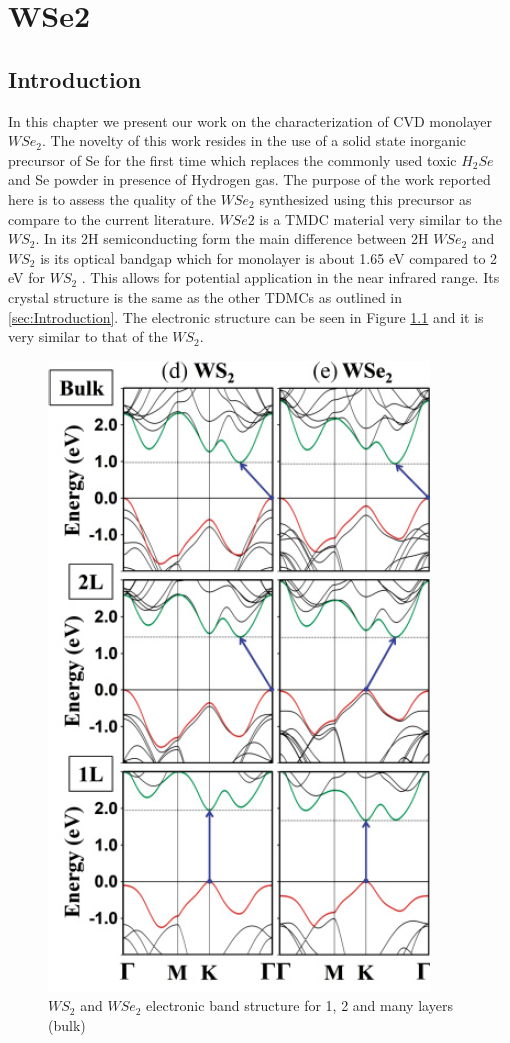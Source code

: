 \chapter{WSe2}

\section{Introduction}
	
	In this chapter we present our work on the characterization of CVD monolayer $WSe_2$. The novelty of this work resides in the use of a solid state inorganic precursor of Se for the first time which replaces the commonly used toxic $H_2Se$ and Se powder in presence of Hydrogen gas.  The purpose of the work reported here is to assess the quality of the $WSe_2$ synthesized using this precursor as compare to the current literature. $WSe2$ is a TMDC material very similar to the $WS_2$. In its 2H semiconducting form the main difference between 2H $WSe_2$ and $WS_2$ is its optical bandgap which for monolayer is about 1.65 eV compared to 2 eV for $WS_2$ . This allows for potential application in the near infrared range. Its crystal structure is the same as the other TDMCs as outlined in \ref{sec:Introduction}. The electronic structure can be seen in Figure \ref{fig:WSe2BandStructureWSe2WS2} and it is very similar to that of the $WS_2$. 
		
\begin{figure}[!h]
	\begin{center}
		\includegraphics[scale=0.5]{WSe2/WSe2BandStructureWSe2WS2.png}
		\caption{$WS_2$ and $WSe_2$ electronic band structure for 1, 2 and many layers (bulk)}
		\label{fig:WSe2BandStructureWSe2WS2}
	\end{center}
\end{figure}
	
